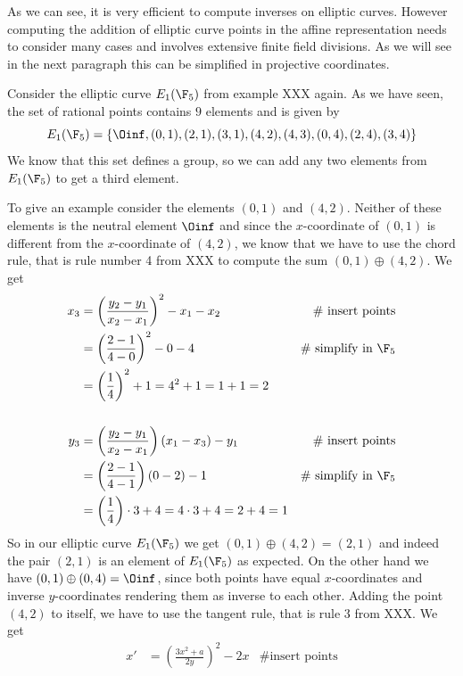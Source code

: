 As we can see, it is very efficient to compute inverses on elliptic curves. However computing the addition of elliptic curve points in the affine representation needs to consider many cases and involves extensive finite field divisions. As we will see in the next paragraph this can be simplified in projective coordinates.
\begin{example}Consider the elliptic curve $E_1(\F_5)$ from example XXX again.  As we have seen, the set of rational points contains $9$ elements and is given by
$$
E_1(\F_5) = \{\Oinf, (0,1),(2,1),(3,1),(4,2),(4,3),(0,4),(2,4),(3,4)\}
$$
We know that this set defines a group, so we can add any two elements from $E_1(\F_5)$ to get a third element. 

To give an example consider the elements $(0,1)$ and $(4,2)$. Neither of these elements is the neutral element $\Oinf$ and since the $x$-coordinate of $(0,1)$ is different from the $x$-coordinate of $(4,2)$, we know that we have to use the chord rule, that is rule number 4 from XXX to compute the sum $(0,1)\oplus (4,2)$. We get
\begin{align*}
x_3  & = \left(\frac{y_2-y_1}{x_2-x_1}\right)^2 -x_1-x_2 & \text{\# insert points}\\
     & = \left(\frac{2-1}{4-0}\right)^2 -0-4  & \text{\# simplify in } \F_5\\
     & = \left(\frac{1}{4}\right)^2 +1
       = 4^2 +1
       = 1 +1 
       = 2
\\
\\
y_3  & = \left(\frac{y_2-y_1}{x_2-x_1} \right)\left(x_1-x_3\right) - y_1  & \text{\# insert points}\\     
     & = \left(\frac{2-1}{4-1} \right)\left(0-2\right) - 1   & \text{\# simplify in } \F_5\\    
     & = \left(\frac{1}{4} \right)\cdot 3 + 4   
       = 4\cdot 3 + 4
       = 2 + 4
       = 1          
\end{align*} 
So in our elliptic curve $E_1(\F_5)$ we get $(0,1)\oplus (4,2) =(2,1)$ and indeed the pair $(2,1)$ is an element of $E_1(\F_5)$ as expected. On the other hand we have $(0,1)\oplus (0,4) =\Oinf$, since both points have equal $x$-coordinates and inverse $y$-coordinates rendering them as inverse to each other. Adding the point $(4,2)$ to itself, we have to use the tangent rule, that is rule 3 from XXX. We get 
\begin{align*}
x'  & = \left(\frac{3x^2+a}{2y}\right)^2 -2x   & \text{\# insert points}\\

\end{align*}
\end{example}
